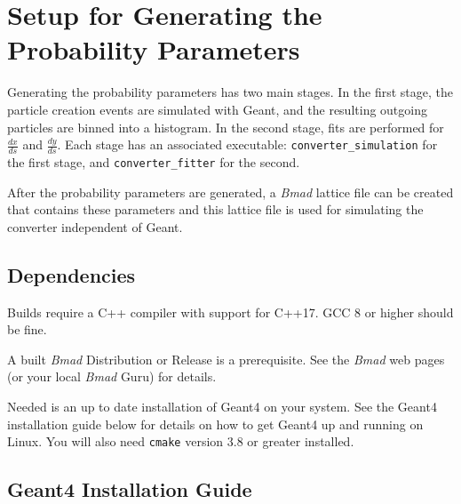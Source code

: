 \documentclass[12pt]{article}
\newcommand{\dxds}{\frac{dx}{ds}}
\newcommand{\dyds}{\frac{dy}{ds}}
\newcommand{\exes}{\texttt{converter\_simulation}\xspace}
\newcommand{\exef}{\texttt{converter\_fitter}\xspace}
\newcommand{\bmad}{\textit{Bmad}\xspace}
\begin{document}
\newpage
\section{Setup for Generating the Probability Parameters}

Generating the probability parameters has two main stages. In the first stage, the particle creation
events are simulated with Geant, and the resulting outgoing particles are binned into a
histogram. In the second stage, fits are performed for $\dxds$ and $\dyds$.  Each stage has an
associated executable: \exes for the first stage, and \exef for the second.

After the probability parameters are generated, a \bmad lattice file can be created that contains
these parameters and this lattice file is used for simulating the converter independent of Geant.

\subsection{Dependencies} 
\label{s:deps} 

Builds require a C++ compiler with support for C++17. GCC 8 or higher should be fine.

A built \bmad Distribution or Release is a prerequisite. See the \bmad web pages (or your local
\bmad Guru) for details.

Needed is an up to date installation of Geant4 on your system. See the Geant4 installation guide
below for details on how to get Geant4 up and running on Linux.  You will also need \texttt{cmake}
version 3.8 or greater installed.

\subsection{Geant4 Installation Guide}
\end{document}
